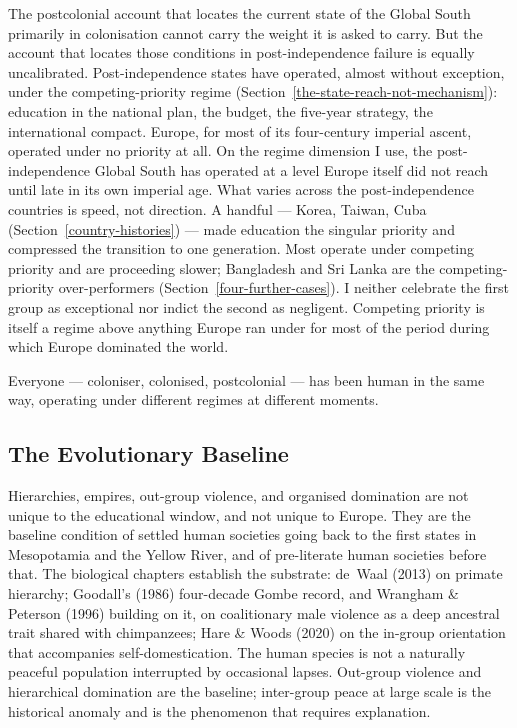 \documentclass[12pt,letterpaper]{article}
\begin{document}
The postcolonial account that locates the current state of the Global
South primarily in colonisation cannot carry the weight it is asked to
carry. But the account that locates those conditions in
post-independence failure is equally uncalibrated. Post-independence
states have operated, almost without exception, under the
competing-priority regime
(Section~\ref{the-state-reach-not-mechanism}): education in the
national plan, the budget, the five-year strategy, the international
compact. Europe, for most of its four-century imperial ascent,
operated under no priority at all. On the regime dimension I
use, the post-independence Global South has operated at a level
Europe itself did not reach until late in its own imperial age. What
varies across the post-independence countries is speed, not direction.
A handful --- Korea, Taiwan, Cuba
(Section~\ref{country-histories}) --- made education the singular priority and
compressed the transition to one generation. Most operate under
competing priority and are proceeding slower; Bangladesh and Sri Lanka
are the competing-priority over-performers
(Section~\ref{four-further-cases}). I neither
celebrate the first group as exceptional nor indict the second as
negligent. Competing priority is itself a regime above anything Europe
ran under for most of the period during which Europe dominated the
world.

Everyone --- coloniser, colonised, postcolonial --- has been human in
the same way, operating under different regimes at different moments.

\subsection{The Evolutionary Baseline}\label{the-evolutionary-baseline}

Hierarchies, empires, out-group violence, and organised domination are
not unique to the educational window, and not unique to Europe. They
are the baseline condition of settled human societies going back to
the first states in Mesopotamia and the Yellow River, and of
pre-literate human societies before that. The biological chapters
establish the substrate: de~Waal (2013) on primate hierarchy;
Goodall's (1986) four-decade Gombe record, and Wrangham
\& Peterson (1996) building on it, on coalitionary male violence as a
deep ancestral trait shared with chimpanzees; Hare \& Woods (2020) on
the in-group orientation that accompanies self-domestication. The human species is not a naturally peaceful
population interrupted by occasional lapses. Out-group violence and
hierarchical domination are the baseline; inter-group peace at large
scale is the historical anomaly and is the phenomenon that requires
explanation.
\end{document}

